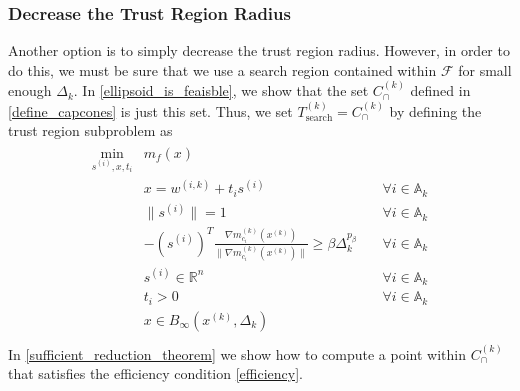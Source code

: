 \documentclass{article}
\newenvironment{comment}
  {\par\medskip
   \color{red}%
   \begin{framed}
   \textbf{Comment: }\ignorespaces}
 {\end{framed}
  \medskip}
\theoremstyle{case}
\numberwithin{theorem}{subsection}
\newcommand{\activeconstraintsk}{{\mathbb A_{k}}}
\newcommand{\capcones}{{C^{(k)}_{\cap}}}
\newcommand{\dk}{\Delta_k}
\newcommand{\feasible}{{\mathcal F}}
\newcommand{\hgik}{{\frac{\nabla m^{(k)}_{c_i}(\xk)}{\|\nabla m^{(k)}_{c_i}(\xk)\|}}}
\newcommand{\Rn}{\mathbb R^n}
\newcommand{\searchtrk}{{T_{\text{search}}^{(k)}}}
\newcommand{\tr}{{ B_{\infty}\left(\xk, \dk\right) }}
\newcommand{\wik}{{w^{(i, k)}}}
\newcommand{\xk}{{x^{(k)}}}
\begin{document}



\subsubsection{Decrease the Trust Region Radius}

Another option is to simply decrease the trust region radius.
However, in order to do this, we must be sure that we use a search region contained within $\feasible$ for small enough $\dk$.
In \cref{ellipsoid_is_feaisble}, we show that the set $\capcones$ defined in \cref{define_capcones} is just this set.
Thus, we set $\searchtrk = \capcones$ by defining the trust region subproblem as
\begin{align}
\label{capcones_tr_subproblem}
\begin{array}{ccc}
\min_{s^{(i)},x,t_i} & m_f(x) & \\
 & x = \wik + t _i s^{(i)} & \quad \forall i \in \activeconstraintsk \\
 & \|s^{(i)}\| = 1 & \quad \forall i \in \activeconstraintsk \\
 & -\left(s^{(i)}\right)^T\hgik \ge \beta \dk^{p_{\beta}} & \quad \forall i \in \activeconstraintsk \\
 & s^{(i)} \in \Rn  & \quad \forall i \in \activeconstraintsk \\
 & t_i > 0          & \quad \forall i \in \activeconstraintsk \\
 & x \in \tr		& \\
\end{array}
\end{align}
In \cref{sufficient_reduction_theorem} we show how to compute a point within $\capcones$ that satisfies the efficiency condition \cref{efficiency}.


\end{document}
